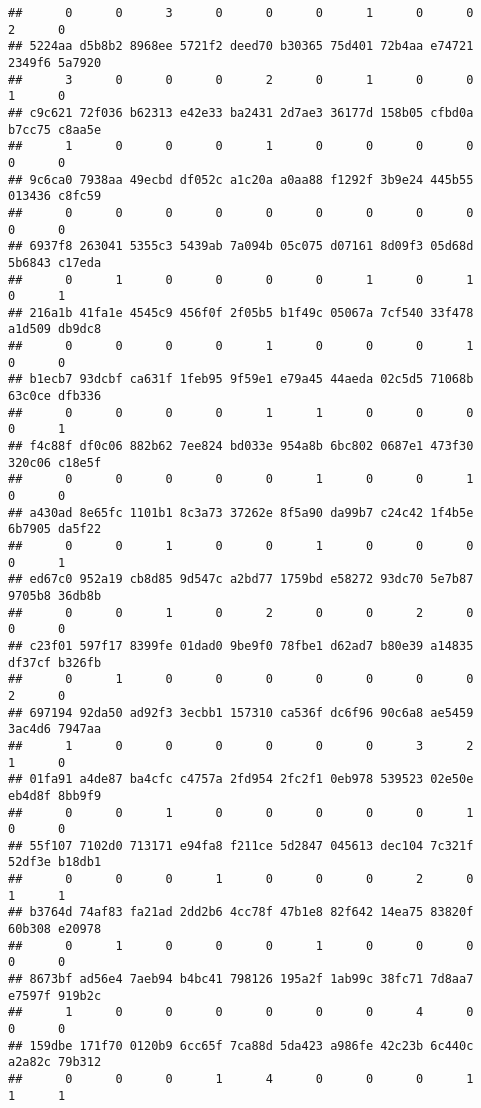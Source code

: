 \documentclass[
]{article}
\begin{document}
\begin{verbatim}
##      0      0      3      0      0      0      1      0      0      2      0 
## 5224aa d5b8b2 8968ee 5721f2 deed70 b30365 75d401 72b4aa e74721 2349f6 5a7920 
##      3      0      0      0      2      0      1      0      0      1      0 
## c9c621 72f036 b62313 e42e33 ba2431 2d7ae3 36177d 158b05 cfbd0a b7cc75 c8aa5e 
##      1      0      0      0      1      0      0      0      0      0      0 
## 9c6ca0 7938aa 49ecbd df052c a1c20a a0aa88 f1292f 3b9e24 445b55 013436 c8fc59 
##      0      0      0      0      0      0      0      0      0      0      0 
## 6937f8 263041 5355c3 5439ab 7a094b 05c075 d07161 8d09f3 05d68d 5b6843 c17eda 
##      0      1      0      0      0      0      1      0      1      0      1 
## 216a1b 41fa1e 4545c9 456f0f 2f05b5 b1f49c 05067a 7cf540 33f478 a1d509 db9dc8 
##      0      0      0      0      1      0      0      0      1      0      0 
## b1ecb7 93dcbf ca631f 1feb95 9f59e1 e79a45 44aeda 02c5d5 71068b 63c0ce dfb336 
##      0      0      0      0      1      1      0      0      0      0      1 
## f4c88f df0c06 882b62 7ee824 bd033e 954a8b 6bc802 0687e1 473f30 320c06 c18e5f 
##      0      0      0      0      0      1      0      0      1      0      0 
## a430ad 8e65fc 1101b1 8c3a73 37262e 8f5a90 da99b7 c24c42 1f4b5e 6b7905 da5f22 
##      0      0      1      0      0      1      0      0      0      0      1 
## ed67c0 952a19 cb8d85 9d547c a2bd77 1759bd e58272 93dc70 5e7b87 9705b8 36db8b 
##      0      0      1      0      2      0      0      2      0      0      0 
## c23f01 597f17 8399fe 01dad0 9be9f0 78fbe1 d62ad7 b80e39 a14835 df37cf b326fb 
##      0      1      0      0      0      0      0      0      0      2      0 
## 697194 92da50 ad92f3 3ecbb1 157310 ca536f dc6f96 90c6a8 ae5459 3ac4d6 7947aa 
##      1      0      0      0      0      0      0      3      2      1      0 
## 01fa91 a4de87 ba4cfc c4757a 2fd954 2fc2f1 0eb978 539523 02e50e eb4d8f 8bb9f9 
##      0      0      1      0      0      0      0      0      1      0      0 
## 55f107 7102d0 713171 e94fa8 f211ce 5d2847 045613 dec104 7c321f 52df3e b18db1 
##      0      0      0      1      0      0      0      2      0      1      1 
## b3764d 74af83 fa21ad 2dd2b6 4cc78f 47b1e8 82f642 14ea75 83820f 60b308 e20978 
##      0      1      0      0      0      1      0      0      0      0      0 
## 8673bf ad56e4 7aeb94 b4bc41 798126 195a2f 1ab99c 38fc71 7d8aa7 e7597f 919b2c 
##      1      0      0      0      0      0      0      4      0      0      0 
## 159dbe 171f70 0120b9 6cc65f 7ca88d 5da423 a986fe 42c23b 6c440c a2a82c 79b312 
##      0      0      0      1      4      0      0      0      1      1      1 

\end{verbatim}
\end{document}
